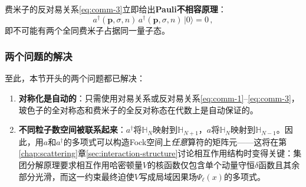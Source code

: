 \noindent 费米子的反对易关系\eqref{eq:comm-3}立即给出\textbf{Pauli不相容原理}：
\begin{equation}
a^\dagger(\boldsymbol{p},\sigma,n)\,a^\dagger(\boldsymbol{p},\sigma,n)\,|0\rangle = 0\,,
\end{equation}
即不可能有两个全同费米子占据同一量子态。

\subsubsection*{两个问题的解决}

至此，本节开头的两个问题都已解决：
\begin{enumerate}
    \item \textbf{对称化是自动的}：只需使用对易关系或反对易关系\eqref{eq:comm-1}--\eqref{eq:comm-3}，玻色子的全对称态和费米子的全反对称态在代数上是自动保证的。

    \item \textbf{不同粒子数空间被联系起来}：$a^\dagger$将$\mathbb{H}_N$映射到$\mathbb{H}_{N+1}$，$a$将$\mathbb{H}_N$映射到$\mathbb{H}_{N-1}$。因此，用$a$和$a^\dagger$的多项式可以构造Fock空间上\emph{任意}算符的矩阵元——这将在第\ref{chap:scattering}章\ref{sec:interaction-structure}讨论相互作用结构时变得关键：集团分解原理要求相互作用哈密顿量$V$的核函数仅包含单个动量守恒$\delta$函数且其余部分光滑，而这一约束最终迫使$V$写成局域因果场$\Psi_\ell(x)$的多项式。
\end{enumerate}